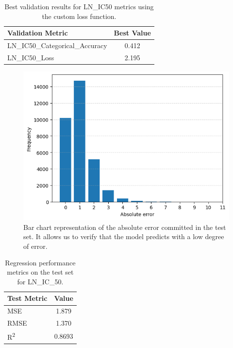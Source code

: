 \begin{table}[H]
    \centering
    \begin{tabular}{|l|c|}
    \hline
    \textbf{Validation Metric} & \textbf{Best Value} \\
    \hline
    LN\_IC50\_Categorical\_Accuracy & 0.412 \\
    LN\_IC50\_Loss & 2.195 \\
    \hline
    \end{tabular}
    \caption{Best validation results for LN\_IC50 metrics using the custom loss function.}
    \label{tab:best_val_ln_ic50_customloss}
\end{table}

\begin{figure}[H]
    \centering
    \includegraphics[width=1\textwidth]{figures/neural_net_classification/catogorical_net_barplot.png}
    \caption{Bar chart representation of the absolute error committed in the test set. It allows us to verify that the model predicts with a low degree of error.}
    \label{fig:train_class_net_v4_barplot}
\end{figure}

\begin{table}[H]
    \centering
    \begin{tabular}{|l|c|}
    \hline
    \textbf{Test Metric} & \textbf{Value} \\
    \hline
    MSE & 1.879 \\
    RMSE & 1.370 \\
    R\textsuperscript{2} & 0.8693 \\
    \hline
    \end{tabular}
    \caption{Regression performance metrics on the test set for LN\_IC\_50.}
    \label{tab:test_regression_metrics:net_class_v4}
\end{table}

